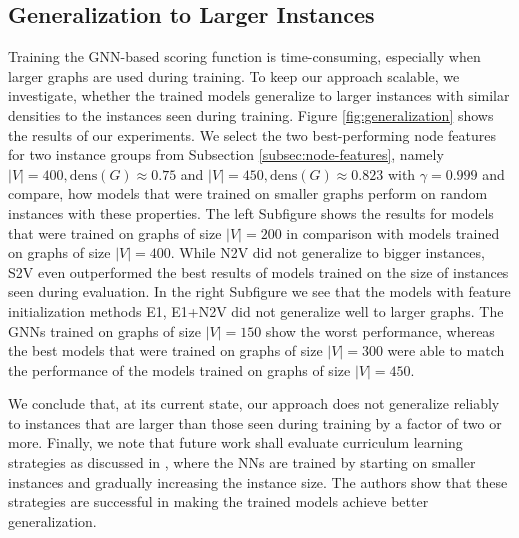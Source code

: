 \documentclass[draft,final]{vutinfth} %
\begin{document}
\subsection{Generalization to Larger Instances}
Training the GNN-based scoring function is time-consuming, especially when larger graphs are used during training. To keep our approach scalable, we investigate, whether the trained models generalize to larger instances with similar densities to the instances seen during training. 
Figure \ref{fig:generalization} shows the results of our experiments. We select the two best-performing node features for two instance groups from Subsection \ref{subsec:node-features}, namely $|V|=400, \mathrm{dens}(G) \approx 0.75$ and $|V|=450, \mathrm{dens}(G) \approx 0.823$ with $\gamma=0.999$ and compare, how models that were trained on smaller graphs perform on random instances with these properties. The left Subfigure shows the results for models that were trained on graphs of size $|V| = 200$ in comparison with models trained on graphs of size $|V|=400$. While N2V did not generalize to bigger instances, S2V even outperformed the best results of models trained on the size of instances seen during evaluation. 
In the right Subfigure we see that the models with feature initialization methods E1, E1+N2V did not generalize well to larger graphs. The GNNs trained on graphs of size $|V|=150$ show the worst performance, whereas the best models that were trained on graphs of size $|V|=300$ were able to match the performance of the models trained on graphs of size $|V|=450$.

We conclude that, at its current state, our approach does not generalize reliably to instances that are larger than those seen during training by a factor of two or more. 
Finally, we note that future work shall evaluate curriculum learning strategies as discussed in \cite{Lisicki2020}, where the NNs are trained by starting on smaller instances and gradually increasing the instance size. The authors show that these strategies are successful in making the trained models achieve better generalization. 
\end{document}
